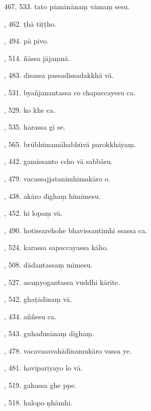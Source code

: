 467, 533. tato pāmānānaṃ vāmaṃ sesu.\hfill \pageref{sut:467}\par {}, 462. ṭhā tiṭṭho.\hfill \pageref{sut:468}\par {}, 494. pā pivo.\hfill \pageref{sut:469}\par {}, 514. ñāssa jājaṃnā.\hfill \pageref{sut:470}\par {}, 483. disassa passadissadakkhā vā.\hfill \pageref{sut:471}\par {}, 531. byañjanantassa co chapaccayesu ca.\hfill \pageref{sut:472}\par {}, 529. ko khe ca.\hfill \pageref{sut:473}\par {}, 535. harassa gī se.\hfill \pageref{sut:474}\par {}, 565. brūbhūnamāhabhūvā parokkhāyaṃ.\hfill \pageref{sut:475}\par {}, 442. gamissanto ccho vā sabbāsu.\hfill \pageref{sut:476}\par {}, 479. vacassajjatanimhimakāro o.\hfill \pageref{sut:477}\par {}, 438. akāro dīghaṃ himimesu.\hfill \pageref{sut:478}\par {}, 452. hi lopaṃ vā.\hfill \pageref{sut:479}\par {}, 490. hotissarehohe bhavissantimhi ssassa ca.\hfill \pageref{sut:480}\par {}, 524. karassa sapaccayassa kāho.\hfill \pageref{sut:481}\par {}, 508. dādantassaṃ mimesu.\hfill \pageref{sut:482}\par {}, 527. asaṃyogantassa vuddhi kārite.\hfill \pageref{sut:483}\par {}, 542. ghaṭādīnaṃ vā.\hfill \pageref{sut:484}\par {}, 434. aññesu ca.\hfill \pageref{sut:485}\par {}, 543. guhadusānaṃ dīghaṃ.\hfill \pageref{sut:486}\par {}, 478. vacavasavahādīnamukāro vassa ye.\hfill \pageref{sut:487}\par {}, 481. havipariyayo lo vā.\hfill \pageref{sut:488}\par {}, 519. gahassa ghe ppe.\hfill \pageref{sut:489}\par {}, 518. halopo ṇhāmhi.\hfill \pageref{sut:490}\par \noindent
